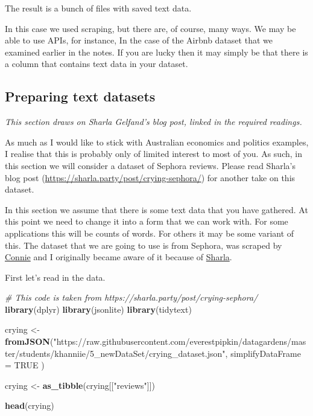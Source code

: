 \documentclass[
]{book}
\newenvironment{Shaded}{\begin{snugshade}}{\end{snugshade}}
\newcommand{\CommentTok}[1]{\textcolor[rgb]{0.56,0.35,0.01}{\textit{#1}}}
\newcommand{\DataTypeTok}[1]{\textcolor[rgb]{0.13,0.29,0.53}{#1}}
\newcommand{\KeywordTok}[1]{\textcolor[rgb]{0.13,0.29,0.53}{\textbf{#1}}}
\newcommand{\NormalTok}[1]{#1}
\newcommand{\OtherTok}[1]{\textcolor[rgb]{0.56,0.35,0.01}{#1}}
\newcommand{\StringTok}[1]{\textcolor[rgb]{0.31,0.60,0.02}{#1}}
\begin{document}
The result is a bunch of files with saved text data.

In this case we used scraping, but there are, of course, many ways. We may be able to use APIs, for instance, In the case of the Airbnb dataset that we examined earlier in the notes. If you are lucky then it may simply be that there is a column that contains text data in your dataset.

\hypertarget{preparing-text-datasets}{%
\subsection{Preparing text datasets}\label{preparing-text-datasets}}

\emph{This section draws on Sharla Gelfand's blog post, linked in the required readings.}

As much as I would like to stick with Australian economics and politics examples, I realise that this is probably only of limited interest to most of you. As such, in this section we will consider a dataset of Sephora reviews. Please read Sharla's blog post (\url{https://sharla.party/post/crying-sephora/}) for another take on this dataset.

In this section we assume that there is some text data that you have gathered. At this point we need to change it into a form that we can work with. For some applications this will be counts of words. For others it may be some variant of this. The dataset that we are going to use is from Sephora, was scraped by \href{https://twitter.com/crabbage_/}{Connie} and I originally became aware of it because of \href{https://sharla.party/post/crying-sephora/}{Sharla}.

First let's read in the data.

\begin{Shaded}
\begin{Highlighting}[]
\CommentTok{# This code is taken from https://sharla.party/post/crying-sephora/}
\KeywordTok{library}\NormalTok{(dplyr)}
\KeywordTok{library}\NormalTok{(jsonlite)}
\KeywordTok{library}\NormalTok{(tidytext)}

\NormalTok{crying <-}\StringTok{ }\KeywordTok{fromJSON}\NormalTok{(}\StringTok{"https://raw.githubusercontent.com/everestpipkin/datagardens/master/students/khanniie/5_newDataSet/crying_dataset.json"}\NormalTok{,}
  \DataTypeTok{simplifyDataFrame =} \OtherTok{TRUE}
\NormalTok{)}

\NormalTok{crying <-}\StringTok{ }\KeywordTok{as_tibble}\NormalTok{(crying[[}\StringTok{"reviews"}\NormalTok{]])}

\KeywordTok{head}\NormalTok{(crying)}
\end{Highlighting}
\end{Shaded}
\end{document}
